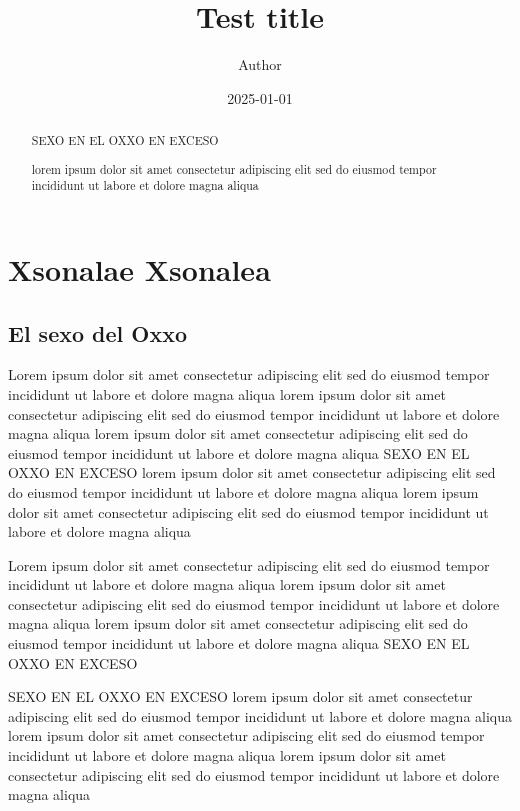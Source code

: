\documentclass{report}
\title{Test title}
\author{Author}
\date{2025-01-01}
\begin{document}

\maketitle

\newpage
\begin{abstract}
	SEXO EN EL OXXO EN EXCESO

	lorem ipsum dolor sit amet consectetur adipiscing elit sed do eiusmod tempor incididunt ut labore et dolore magna aliqua
\end{abstract}

\newpage
\tableofcontents

\newpage
\chapter{Xsonalae Xsonalea}

\newpage
\section{El sexo del Oxxo}
	Lorem ipsum dolor sit amet consectetur adipiscing elit sed do eiusmod tempor incididunt ut labore et dolore magna aliqua
	lorem ipsum dolor sit amet consectetur adipiscing elit sed do eiusmod tempor incididunt ut labore et dolore magna aliqua
	lorem ipsum dolor sit amet consectetur adipiscing elit sed do eiusmod tempor incididunt ut labore et dolore magna aliqua
	SEXO EN EL OXXO EN EXCESO
	lorem ipsum dolor sit amet consectetur adipiscing elit sed do eiusmod tempor incididunt ut labore et dolore magna aliqua
	lorem ipsum dolor sit amet consectetur adipiscing elit sed do eiusmod tempor incididunt ut labore et dolore magna aliqua

	Lorem ipsum dolor sit amet consectetur adipiscing elit sed do eiusmod tempor incididunt ut labore et dolore magna aliqua
	lorem ipsum dolor sit amet consectetur adipiscing elit sed do eiusmod tempor incididunt ut labore et dolore magna aliqua
	lorem ipsum dolor sit amet consectetur adipiscing elit sed do eiusmod tempor incididunt ut labore et dolore magna aliqua
	SEXO EN EL OXXO EN EXCESO
	
	SEXO EN EL OXXO EN EXCESO
	lorem ipsum dolor sit amet consectetur adipiscing elit sed do eiusmod tempor incididunt ut labore et dolore magna aliqua
	lorem ipsum dolor sit amet consectetur adipiscing elit sed do eiusmod tempor incididunt ut labore et dolore magna aliqua
	lorem ipsum dolor sit amet consectetur adipiscing elit sed do eiusmod tempor incididunt ut labore et dolore magna aliqua
\end{document}
